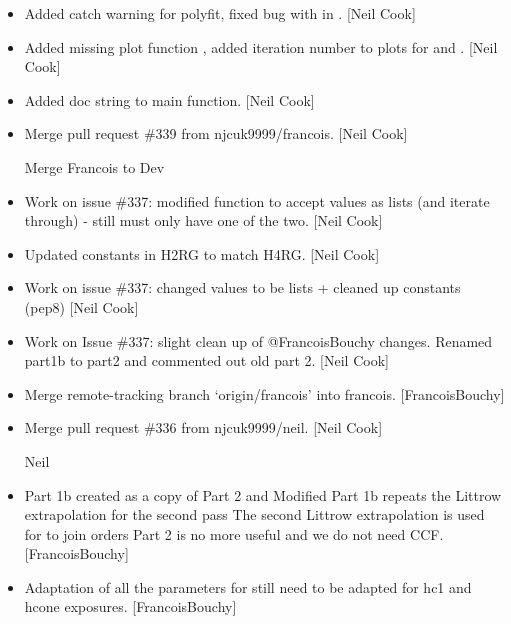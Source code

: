 \documentclass[a4paper,10pt,english]{report}
\begin{document}
\begin{itemize}
\item {} 
Added catch warning for polyfit, fixed bug with  in
. {[}Neil Cook{]}

\item {} 
Added missing plot function , added
iteration number to plots for  and
. {[}Neil Cook{]}

\item {} 
Added doc string to  main function. {[}Neil Cook{]}

\item {} 
Merge pull request \#339 from njcuk9999/francois. {[}Neil Cook{]}

Merge Francois to Dev

\item {} 
Work on issue \#337: modified  function to accept
 values as lists (and iterate through) - still must only have
one of the two. {[}Neil Cook{]}

\item {} 
Updated constants in H2RG to match H4RG. {[}Neil Cook{]}

\item {} 
Work on issue \#337: changed  values to be lists + cleaned up
constants (pep8) {[}Neil Cook{]}

\item {} 
Work on Issue \#337: slight clean up of @FrancoisBouchy changes.
Renamed part1b to part2 and commented out old part 2. {[}Neil Cook{]}

\item {} 
Merge remote-tracking branch ‘origin/francois’ into francois.
{[}FrancoisBouchy{]}

\item {} 
Merge pull request \#336 from njcuk9999/neil. {[}Neil Cook{]}

Neil

\item {} 
Part 1b created as a copy of Part 2 and Modified Part 1b repeats the
Littrow extrapolation for the second pass The second Littrow
extrapolation is used for to join orders Part 2 is no more useful and
we do not need CCF. {[}FrancoisBouchy{]}

\item {} 
Adaptation of all the parameters for   still need to be
adapted for hc1 and hcone exposures. {[}FrancoisBouchy{]}


\end{itemize}
\end{document}

